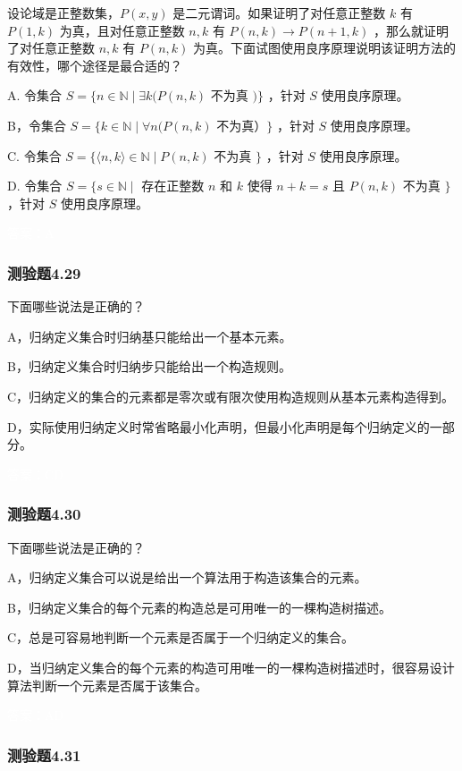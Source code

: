 \documentclass[UTF8, heading=true]{ctexart}
\begin{document}
设论域是正整数集，$P(x, y)$ 是二元谓词。如果证明了对任意正整数 $k$ 有 $P(1, k)$ 为真，且对任意正整数 $n, k$ 有 $P(n, k) \rightarrow P(n+1, k)$ ，那么就证明了对任意正整数 $n, k$ 有 $P(n, k)$ 为真。下面试图使用良序原理说明该证明方法的有效性，哪个途径是最合适的？

A. 令集合 $S=\{n \in \mathbb{N} \mid \exists k(P(n, k)$ 不为真 $)\}$ ，针对 $S$ 使用良序原理。

B，令集合 $S=\{k \in \mathbb{N} \mid \forall n(P(n, k)$ 不为真）$\}$ ，针对 $S$ 使用良序原理。

C. 令集合 $S=\{\langle n, k\rangle \in \mathbb{N} \mid P(n, k)$ 不为真 $\}$ ，针对 $S$ 使用良序原理。

D.  
令集合 $S=\{s \in \mathbb{N} \mid$ 存在正整数 $n$ 和 $k$ 使得 $n+k=s$ 且 $P(n, k)$ 不为真 $\}$ ，针对 $S$ 使用良序原理。

\textcolor{white}{答案：A}

\subsubsection{测验题4.29}

下面哪些说法是正确的？

A，归纳定义集合时归纳基只能给出一个基本元素。

B，归纳定义集合时归纳步只能给出一个构造规则。

C，归纳定义的集合的元素都是零次或有限次使用构造规则从基本元素构造得到。

D，实际使用归纳定义时常省略最小化声明，但最小化声明是每个归纳定义的一部分。

\textcolor{white}{答案：CD}

\subsubsection{测验题4.30}

下面哪些说法是正确的？

A，归纳定义集合可以说是给出一个算法用于构造该集合的元素。

B，归纳定义集合的每个元素的构造总是可用唯一的一棵构造树描述。

C，总是可容易地判断一个元素是否属于一个归纳定义的集合。

D，当归纳定义集合的每个元素的构造可用唯一的一棵构造树描述时，很容易设计算法判断一个元素是否属于该集合。

\textcolor{white}{答案：AD}

\subsubsection{测验题4.31}
\end{document}
